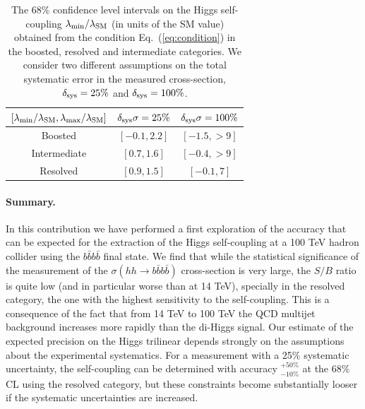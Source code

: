 \documentclass[a4paper,10pt]{article}
\newcommand{\lc}{\left[}
\newcommand{\rc}{\right]}
\begin{document}
\begin{table}[h]
  \centering
  \begin{tabular}{|c|c|c|}
    \hline
  $\lc \lambda_{\rm min}/\lambda_{\rm SM},\lambda_{\rm max}/\lambda_{\rm SM} \rc$  &  $\delta_{\rm sys}\sigma=25\%$ & $\delta_{\rm sys}\sigma=100\%$ \\
    \hline
    \hline
Boosted   & $\lc -0.1, 2.2\rc$  & $\lc -1.5, > 9\rc$  \\
\hline
Intermediate   & $\lc 0.7, 1.6\rc$  &  $\lc -0.4, > 9\rc$  \\
\hline
Resolved   & $\lc 0.9, 1.5\rc$  &  $\lc -0.1, 7\rc$  \\
\hline
  \end{tabular}
  \caption{\small \label{tab:chi2} The 68\% confidence level intervals
    on the Higgs self-coupling $\lambda_{\rm min}/\lambda_{\rm SM}$ (in units of the SM value)
    obtained from the condition
    Eq.~(\ref{eq:condition}) in the boosted, resolved and intermediate categories.
    We consider two different assumptions on the total systematic error in the measured
    cross-section,  $\delta_{\rm sys}=25\%$ and $\delta_{\rm sys}=100\%$.
  }
\end{table}
  
\paragraph{Summary.} In this contribution we have performed a first exploration of the accuracy that can be expected
for the extraction of the Higgs self-coupling at a 100 TeV hadron collider using the $b\bar{b}b\bar{b}$ final state.
%
We find that while the statistical significance of the measurement of the $\sigma(hh\to b\bar{b}b\bar{b})$ cross-section
is very large, the $S/B$ ratio is quite low (and in particular worse than at 14 TeV),
specially in the resolved category, the one with the highest sensitivity
to the self-coupling.
%
This is a consequence of the fact that from 14 TeV to 100 TeV the QCD multijet background increases more rapidly than
the di-Higgs signal.
%
Our estimate of the expected precision on the Higgs trilinear depends strongly on the assumptions
about the experimental systematics.
%
For a measurement with a 25\% systematic uncertainty, the self-coupling can be determined
with accuracy $^{+50\%}_{-10\%}$ at the 68\% CL using the resolved category, but these constraints become substantially
looser if the systematic uncertainties are increased.



\end{document}
